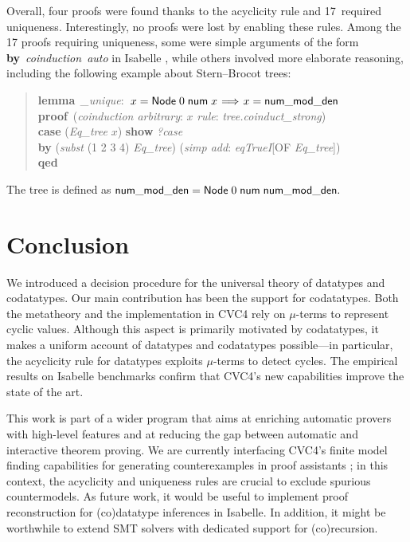 \documentclass[smallcondensed,draft]{svjour3}
\newcommand\keyw[1]{\textbf{#1}}
\newcommand\const[1]{\textsf{#1}}
\newcommand\vthinspace{\kern+0.083333em}
\begin{document}
%
Overall, four proofs were found thanks to
the acyclicity rule and 17~required uniqueness. Interestingly,
no proofs were lost by enabling these rules. Among the 17 proofs requiring uniqueness,
some were simple arguments of the form
\keyw{by}~\textit{coinduction}~\textit{auto}
in Isabelle \cite{blanchette-et-al-2014-impl}, while others
involved more elaborate reasoning, including the following example
about Stern--Brocot trees:
%
\begin{quote}
\keyw{lemma} \,\textit{\nummodden\_unique}: \,$x = \const{Node}\;0\;\const{num}\; x \vthinspace\Longrightarrow\vthinspace x = \const{\nummodden}$ \\
\keyw{proof} \,(\textit{coinduction arbitrary}: $x$ \textit{rule}: \textit{tree.coinduct\_strong}) \\
\noindent\hbox{}\quad  \keyw{case} (\textit{Eq\_tree} $x$) \keyw{show} \textit{?case} \\
\noindent\hbox{}\qquad  \keyw{by} (\textit{subst} (1 2 3 4) \textit{Eq\_tree}) (\textit{simp add}: \textit{eqTrueI}[OF \textit{Eq\_tree}]) \\
\keyw{qed}
\end{quote}
%
\noindent
The tree \const{\nummodden} is defined as $\const{\nummodden} =
\const{Node}\;0\;\const{num}\;\const{\nummodden}.$

\section{Conclusion}
\label{sec:conclusion}

We introduced a decision procedure for the universal theory of datatypes and
codatatypes. Our main
contribution has been the support for codatatypes. Both the metatheory and
the implementation in CVC4 rely on $\mu$-terms to represent cyclic values.
Although this aspect is primarily motivated by codatatypes, it makes
a uniform account of datatypes and codatatypes possible---in particular,
the acyclicity rule for datatypes exploits $\mu$-terms to detect cycles.
The empirical results on Isabelle benchmarks
confirm that CVC4's new capabilities improve the state of the art.

This work is part of a wider program that aims at enriching automatic provers
with high-level features and at reducing the gap between automatic and
interactive theorem proving.
We are currently interfacing CVC4's finite model finding capabilities
for generating counterexamples in proof assistants
\cite{reynolds-et-al-2015-smt};
in this context, the acyclicity and uniqueness rules are
crucial to exclude spurious countermodels.
As future work, it would be useful to implement
proof reconstruction for (co)data\-type inferences in Isabelle.
In addition, it might be worthwhile to
extend SMT solvers with dedicated support for (co)recursion.
\end{document}
